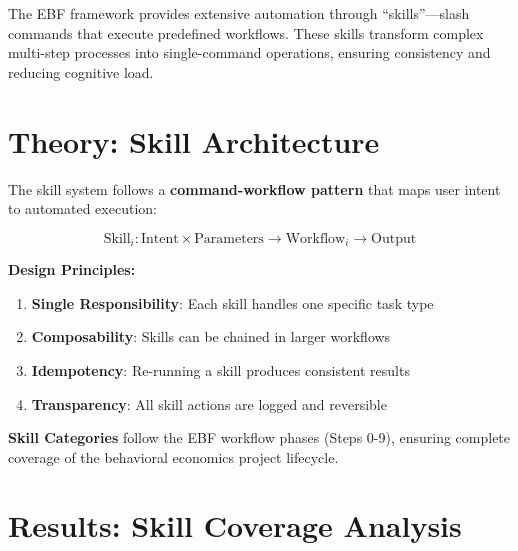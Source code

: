 The EBF framework provides extensive automation through ``skills''---slash
commands that execute predefined workflows. These skills transform complex
multi-step processes into single-command operations, ensuring consistency
and reducing cognitive load.


\section{Theory: Skill Architecture}
\label{sec:skills-theory}

The skill system follows a \textbf{command-workflow pattern} that maps user intent
to automated execution:

\begin{equation}
\text{Skill}_i: \text{Intent} \times \text{Parameters} \rightarrow \text{Workflow}_i \rightarrow \text{Output}
\end{equation}

\textbf{Design Principles:}
\begin{enumerate}
    \item \textbf{Single Responsibility}: Each skill handles one specific task type
    \item \textbf{Composability}: Skills can be chained in larger workflows
    \item \textbf{Idempotency}: Re-running a skill produces consistent results
    \item \textbf{Transparency}: All skill actions are logged and reversible
\end{enumerate}

\textbf{Skill Categories} follow the EBF workflow phases (Steps 0-9), ensuring
complete coverage of the behavioral economics project lifecycle.


\section{Results: Skill Coverage Analysis}
\label{sec:skills-results}

